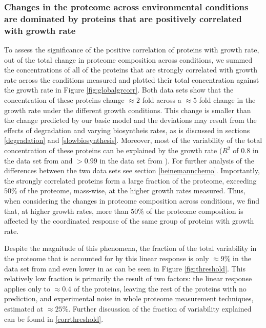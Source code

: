\subsubsection{Changes in the proteome across environmental conditions are dominated by proteins that are positively correlated with growth rate}
To assess the significance of the positive correlation of proteins with growth rate, out of the total change in proteome composition across conditions, we summed the concentrations of all of the proteins that are strongly correlated with growth rate across the conditions measured and plotted their total concentration against the growth rate in Figure \ref{fig:globalgrcorr}.
Both data sets show that the concentration of these proteins change $\approx 2$ fold across a $\approx 5$ fold change in the growth rate under the different growth conditions.
This change is smaller than the change predicted by our basic model and the deviations may result from the effects of degradation and varying biosyntheis rates, as is discussed in sections \ref{degradation} and \ref{slowbiosynthesis}.
Moreover, most of the variability of the total concentration of these proteins can be explained by the growth rate ($R^2$ of $0.8$ in the data set from \cite{Heinemann2015} and $>0.99$ in the data set from \cite{Valgepea2013}). 
For further analysis of the differences between the two data sets see section \ref{heinemannchemo}.
Importantly, the strongly correlated proteins form a large fraction of the proteome, exceeding $50\%$ of the proteome, mass-wise, at the higher growth rates measured.
Thus, when considering the changes in proteome composition across conditions, we find that, at higher growth rates, more than $50\%$ of the proteome composition is affected by the coordinated response of the same group of proteins with growth rate.

Despite the magnitude of this phenomena, the fraction of the total variability in the proteome that is accounted for by this linear response is only $\approx 9\%$  in the data set from \cite{Heinemann2015} and even lower in \cite{Valgepea2013} as can be seen in Figure \ref{fig:threshold}.
This relatively low fraction is primarily the result of two factors: the linear response applies only to $\approx0.4$ of the proteins, leaving the rest of the proteins with no prediction, and experimental noise in whole proteome measurement techniques, estimated at $\approx25\%$.
Further discussion of the fraction of variability explained can be found in \ref{corrthreshold}.